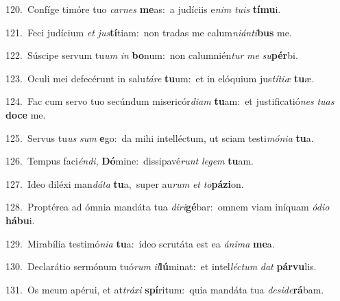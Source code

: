 {\numbfont\textcolor{\numbcolor}{120.}}~Confíge timóre tuo \textit{car}\-\textit{nes} \textbf{me}\-as:~\star a judíciis e\textit{nim} \textit{tu}\-\textit{is} \textbf{tí}\-\textbf{mu}i.\par
{\numbfont\textcolor{\numbcolor}{121.}}~Feci judícium \textit{et} \textit{jus}\-\textbf{tí}tiam:~\star non tradas me calum\-\textit{ni}\-\textit{án}\textit{ti}\textbf{bus} me.\par
{\numbfont\textcolor{\numbcolor}{122.}}~Súscipe servum tu\textit{um} \textit{in} \textbf{bo}\-num:~\star non calumnién\textit{tur} \textit{me} \textit{su}\-\textbf{pér}bi.\par
{\numbfont\textcolor{\numbcolor}{123.}}~Oculi mei defecérunt in salu\-\textit{tá}\-\textit{re} \textbf{tu}\-um:~\star et in elóquium jus\-\textit{tí}\-\textit{ti}\textit{æ} \textbf{tu}\-æ.\par
{\numbfont\textcolor{\numbcolor}{124.}}~Fac cum servo tuo secúndum misericór\-\textit{di}\-\textit{am} \textbf{tu}\-am:~\star et justificatió\textit{nes} \textit{tu}\-\textit{as} \textbf{do}\-\textbf{ce} me.\par
{\numbfont\textcolor{\numbcolor}{125.}}~Servus tu\textit{us} \textit{sum} \textbf{e}\-go:~\star da mihi intelléctum, ut sciam testi\-\textit{mó}\-\textit{ni}\textit{a} \textbf{tu}\-a.\par
{\numbfont\textcolor{\numbcolor}{126.}}~Tempus faci\-\textit{én}\-\textit{di}, \textbf{Dó}\-mine:~\star dissipavé\textit{runt} \textit{le}\-\textit{gem} \textbf{tu}\-am.\par
{\numbfont\textcolor{\numbcolor}{127.}}~Ideo diléxi man\-\textit{dá}\-\textit{ta} \textbf{tu}\-a,~\star super au\textit{rum} \textit{et} \textit{to}\-\textbf{pá}\textbf{zi}on.\par
{\numbfont\textcolor{\numbcolor}{128.}}~Proptérea ad ómnia mandáta tua \textit{di}\-\textit{ri}\textbf{gé}bar:~\star omnem viam iníquam \textit{ó}\-\textit{di}\textit{o} \textbf{há}\-\textbf{bu}i.\par
{\numbfont\textcolor{\numbcolor}{129.}}~Mirabília testimó\-\textit{ni}\-\textit{a} \textbf{tu}\-a:~\star ídeo scrutáta est ea \textit{á}\-\textit{ni}\textit{ma} \textbf{me}\-a.\par
{\numbfont\textcolor{\numbcolor}{130.}}~Declarátio sermónum tuó\textit{rum} \textit{il}\-\textbf{lú}minat:~\star et intel\-\textit{léc}\-\textit{tum} \textit{dat} \textbf{pár}\-\textbf{vu}lis.\par
{\numbfont\textcolor{\numbcolor}{131.}}~Os meum apérui, et at\-\textit{trá}\-\textit{xi} \textbf{spí}\-ritum:~\star quia mandáta tua \textit{de}\-\textit{si}\textit{de}\textbf{rá}bam.\par
